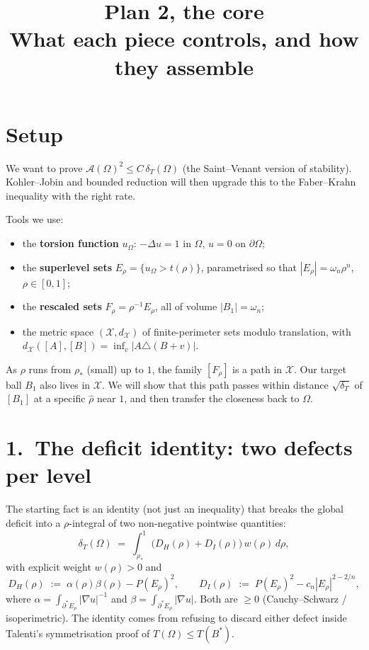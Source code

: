 \documentclass[11pt,a4paper]{article}
\title{\textbf{Plan 2, the core}\\[3pt]
\large What each piece controls, and how they assemble}
\author{}\date{}
\newcommand{\X}{\mathcal{X}}
\newcommand{\Erho}{E_\rho}
\newcommand{\Frho}{F_\rho}
\newcommand{\rhad}{\widehat{\rho}}
\newcommand{\Bstar}{B^{*}}
\newcommand{\Fr}{\mathcal{A}}
\newcommand{\deltaT}{\delta_T}
\newcommand{\dX}{d_{\X}}
\begin{document}
\maketitle\vspace{-2em}

\section*{Setup}

We want to prove $\Fr(\Omega)^2 \le C\,\deltaT(\Omega)$ (the Saint--Venant version of stability). Kohler--Jobin and bounded reduction will then upgrade this to the Faber--Krahn inequality with the right rate.

Tools we use:
\begin{itemize}[leftmargin=*,itemsep=1pt]
\item the \textbf{torsion function} $u_\Omega$: $-\Delta u = 1$ in $\Omega$, $u = 0$ on $\partial\Omega$;
\item the \textbf{superlevel sets} $\Erho = \{u_\Omega > t(\rho)\}$, parametrised so that $|\Erho| = \omega_n \rho^n$, $\rho \in [0,1]$;
\item the \textbf{rescaled sets} $\Frho = \rho^{-1}\Erho$, all of volume $|B_1| = \omega_n$;
\item the metric space $(\X, \dX)$ of finite-perimeter sets modulo translation, with $\dX([A],[B]) = \inf_v |A \triangle (B+v)|$.
\end{itemize}

As $\rho$ runs from $\rho_*$ (small) up to $1$, the family $[\Frho]$ is a path in $\X$. Our target ball $B_1$ also lives in $\X$. We will show that this path passes within distance $\sqrt{\deltaT}$ of $[B_1]$ at a specific $\rhad$ near $1$, and then transfer the closeness back to $\Omega$.

\section*{1.\ The deficit identity: two defects per level}

The starting fact is an identity (not just an inequality) that breaks the global deficit into a $\rho$-integral of two non-negative pointwise quantities:
\[
\boxed{\deltaT(\Omega) \;=\; \int_{\rho_*}^{1} \bigl(D_H(\rho) + D_I(\rho)\bigr)\, w(\rho)\, d\rho,}
\]
with explicit weight $w(\rho) > 0$ and
\[
D_H(\rho) \;:=\; \alpha(\rho)\beta(\rho) - P(\Erho)^2,\qquad
D_I(\rho) \;:=\; P(\Erho)^2 - c_n |\Erho|^{2-2/n},
\]
where $\alpha = \int_{\partial^*\Erho}|\nabla u|^{-1}$ and $\beta = \int_{\partial^*\Erho}|\nabla u|$. Both are $\ge 0$ (Cauchy--Schwarz / isoperimetric). The identity comes from refusing to discard either defect inside Talenti's symmetrisation proof of $T(\Omega) \le T(\Bstar)$.
\end{document}
